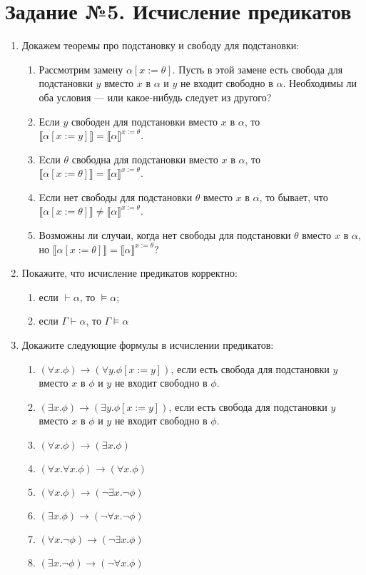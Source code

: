 \documentclass[10pt,a4paper,oneside]{article}
\begin{document}
\section*{Задание №5. Исчисление предикатов}
\begin{enumerate}
\item Докажем теоремы про подстановку и свободу для подстановки:
\begin{enumerate}
\item Рассмотрим замену $\alpha[x := \theta]$. Пусть в этой замене есть свобода для подстановки $y$ вместо $x$ в $\alpha$ и 
$y$ не входит свободно в $\alpha$. Необходимы ли оба условия --- или какое-нибудь следует из другого?
\item Если $y$ свободен
для подстановки вместо $x$ в $\alpha$, то
$\llbracket\alpha[x := y]\rrbracket = \llbracket\alpha\rrbracket^{ x := \theta }$.
\item Eсли $\theta$ свободна
для подстановки вместо $x$ в $\alpha$, то $\llbracket\alpha[x := \theta]\rrbracket = \llbracket\alpha\rrbracket^{ x := \theta }$.
\item Eсли нет свободы
для подстановки $\theta$ вместо $x$ в $\alpha$, то бывает, что 
$\llbracket\alpha[x := \theta]\rrbracket \ne \llbracket\alpha\rrbracket^{ x := \theta }$.
\item Возможны ли случаи, когда нет свободы
для подстановки $\theta$ вместо $x$ в $\alpha$, но $\llbracket\alpha[x := \theta]\rrbracket = \llbracket\alpha\rrbracket^{ x := \theta }$?
\end{enumerate}

\item Покажите, что исчисление предикатов корректно: 
\begin{enumerate}
\item если $\vdash \alpha$, то $\models\alpha$;
\item если $\Gamma\vdash\alpha$, то $\Gamma\models\alpha$
\end{enumerate}

\item Докажите следующие формулы в исчислении предикатов:
\begin{enumerate}
\item $(\forall x.\phi)\rightarrow (\forall y.\phi[x := y])$, если есть свобода для подстановки $y$ вместо $x$ в $\phi$ и $y$ не входит свободно в $\phi$.
\item $(\exists x.\phi)\rightarrow (\exists y.\phi[x := y])$, если есть свобода для подстановки $y$ вместо $x$ в $\phi$ и $y$ не входит свободно в $\phi$.
\item $(\forall x.\phi)\rightarrow (\exists x.\phi)$
\item $(\forall x.\forall x.\phi) \rightarrow (\forall x.\phi)$
\item $(\forall x.\phi) \rightarrow (\neg \exists x.\neg \phi)$ 
\item $(\exists x.\phi) \rightarrow (\neg \forall x.\neg \phi)$
\item $(\forall x.\neg\phi) \rightarrow (\neg \exists x.\phi)$ 
\item $(\exists x.\neg\phi) \rightarrow (\neg \forall x.\phi)$
\end{enumerate}


\end{enumerate}
\end{document}
